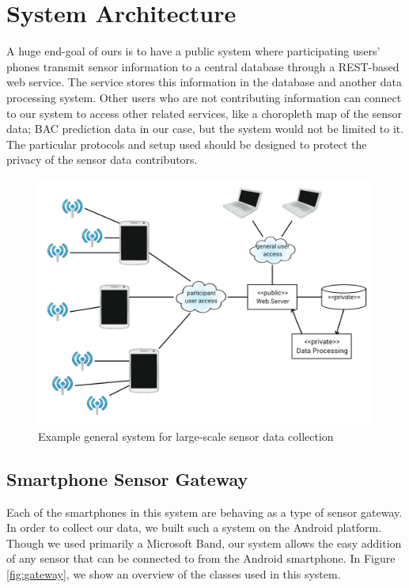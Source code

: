 \section{System Architecture}

A huge end-goal of ours is to have a public system where participating users' phones transmit sensor information to a central database through a REST-based web service. The service stores this information in the database and another data processing system. Other users who are not contributing information can connect to our system to access other related services, like a choropleth map of the sensor data; BAC prediction data in our case, but the system would not be limited to it. The particular protocols and setup used should be designed to protect the privacy of the sensor data contributors.

\begin{figure}
	\includegraphics[width=1.0\textwidth]{../figs/system}
	\caption{Example general system for large-scale sensor data collection}
	\label{fig:system}
\end{figure}

\subsection{Smartphone Sensor Gateway}

Each of the smartphones in this system are behaving as a type of sensor gateway. In order to collect our data, we built such a system on the Android platform. Though we used primarily a Microsoft Band, our system allows the easy addition of any sensor that can be connected to from the Android smartphone. In Figure \ref{fig:gateway}, we show an overview of the classes used in this system.

